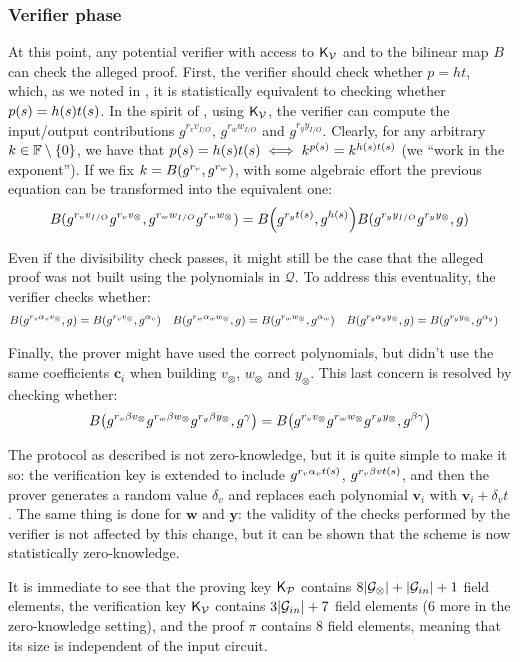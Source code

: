 \subsubsection*{Verifier phase}
At this point, any potential verifier with access to \(\mathsf{K}_\mathcal{V} \) and to the bilinear map 
\(B\) can check the alleged proof.
First, the verifier should check whether \(p = ht\), which, as we noted in , it is 
statistically equivalent to checking whether \(\call{p}{s} = \call{h}{s}\call{t}{s}\).
In the spirit of , using \(\mathsf{K}_\mathcal{V} \), the verifier can compute the 
input/output contributions \(g^{r_{v}v_{I/O}}\), \(g^{r_{w}w_{I/O}}\) and \(g^{r_{y}y_{I/O}}\).
Clearly, for any arbitrary \(k \in \mathbb{F} \setminus \left\{0\right\}\), we have that 
\(\call{p}{s} = \call{h}{s}\call{t}{s} \iff k^{\call{p}{s}} = k^{\call{h}{s}\call{t}{s}}\) (we 
``work in the exponent'').
If we fix \(k = \call{B}{g^{r_v}, g^{r_w}}\), with some algebraic effort the previous 
equation can be transformed into the equivalent one:
\[
  \call{B}{g^{r_{v}v_{I/O}}g^{r_{v}v_{\otimes}}, g^{r_{w}w_{I/O}}g^{r_{w}w_{\otimes}}} =
  \call{B}{g^{r_{y}\call{t}{s}}, g^{\call{h}{s}}}\call{B}{g^{r_{y}y_{I/O}}g^{r_{y}y_{\otimes}}, g}
\]

Even if the divisibility check passes, it might still be the case that the alleged 
proof was not built using the polynomials in \(\mathcal{Q}\).
To address this eventuality, the verifier checks whether:
\begin{align*}
  &  \call{B}{g^{r_{v}\alpha_{v}v_{\otimes}}, g} = \call{B}{g^{r_{v}v_{\otimes}}, g^{\alpha_v}}
  && \call{B}{g^{r_{w}\alpha_{w}w_{\otimes}}, g} = \call{B}{g^{r_{w}w_{\otimes}}, g^{\alpha_w}}
  && \call{B}{g^{r_{y}\alpha_{y}y_{\otimes}}, g} = \call{B}{g^{r_{y}y_{\otimes}}, g^{\alpha_y}}
\end{align*}

Finally, the prover might have used the correct polynomials, but didn't use the same 
coefficients \(\bm{c}_i\) when building \(v_{\otimes}\), \(w_{\otimes}\) and \(y_{\otimes}\).
This last concern is resolved by checking whether:
\[
  \call{B}{g^{r_{v}{\beta}v_{\otimes}}g^{r_{w}{\beta}w_{\otimes}}g^{r_{y}{\beta}y_{\otimes}}, g^{\gamma}} =
  \call{B}{g^{r_{v}v_{\otimes}}g^{r_{w}w_{\otimes}}g^{r_{y}y_{\otimes}}, g^{\beta\gamma}}
\]

The protocol as described is not zero-knowledge, but it is quite simple to make it so:
the verification key is extended to include \(g^{r_{v}\alpha_{v}t\left(s\right)}\), 
\(g^{r_{v}\beta{v}t\left(s\right)}\), and then the prover generates a random value \(\delta_v\) and 
replaces each polynomial \(\bm{v}_i\) with \(\bm{v}_i + \delta_{v}t\). 
The same thing is done for \(\bm{w}\) and \(\bm{y}\): the validity of the checks performed by the 
verifier is not affected by this change, but it can be shown that the scheme is now 
statistically zero-knowledge.

It is immediate to see that the proving key \(\mathsf{K}_\mathcal{P} \) contains 
\(8\abs{\mathcal{G}_{\otimes}} + \abs{\mathcal{G}_{in}} + 1\) field elements, the verification 
key \(\mathsf{K}_\mathcal{V} \) contains \(3\abs{\mathcal{G}_{in}} + 7\) field elements (\(6\) more in the 
zero-knowledge setting), and the proof \(\pi \) contains \(8\) field elements, meaning that its size
is independent of the input circuit.
